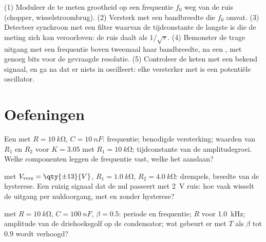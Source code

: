 \begin{method}\label{met:b2:feedback-oscillators:method}
(1) Moduleer de te meten grootheid op een frequentie $f_0$ weg van de ruis
(chopper, wisselstroombrug). (2) Versterk met een bandbreedte die $f_0$
omvat. (3) Detecteer synchroon met een filter waarvan de tijdconstante de
langste is die de meting zich kan veroorloven: de ruis daalt als
$1/\sqrt\tau$. (4) Bemonster de trage uitgang met een frequentie boven
tweemaal haar bandbreedte, na een , met genoeg bits voor
de gevraagde resolutie. (5) Controleer de keten met een bekend signaal, en
ga na dat er niets in oscilleert: elke versterker met  is een
potentiële oscillator.
\end{method}

\section{Oefeningen}

\begin{exercise}[$\star$]\label{exo:b2:feedback-oscillators:1}
Een  met $R = \qty{10}{k\ohm}$, $C = \qty{10}{nF}$:
frequentie; benodigde versterking; waarden van $R_1$ en $R_2$ voor
$K = 3.05$ met $R_1 =
\qty{10}{k\ohm}$; tijdconstante van de amplitudegroei.
Welke componenten leggen de frequentie vast, welke het aanslaan?
\end{exercise}

\begin{exercise}[$\star$]\label{exo:b2:feedback-oscillators:2}
 met $V_{\text{verz}} = \qty{\pm 13}{V}$,
$R_1 = \qty{1.0}{k\ohm}$, $R_2 = \qty{4.0}{k\ohm}$: drempels, breedte van de
hysterese. Een ruizig signaal dat de nul passeert met \qty{2}{V} ruis: hoe
vaak wisselt de uitgang per nuldoorgang, met en zonder hysterese?
\end{exercise}

\begin{exercise}[$\star$]\label{exo:b2:feedback-oscillators:3}
 met $R = \qty{10}{k\ohm}$, $C = \qty{100}{nF}$,
$\beta = 0.5$: periode en frequentie; $R$ voor \qty{1.0}{kHz}; amplitude van
de driehoeksgolf op de condensator; wat gebeurt er met $T$ als $\beta$ tot
$0.9$ wordt verhoogd?
\end{exercise}

